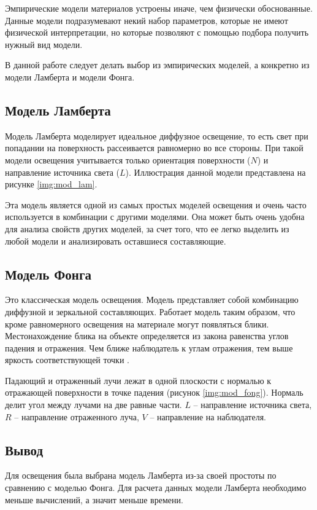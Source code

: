 Эмпирические модели материалов устроены иначе, чем физически обоснованные. Данные модели подразумевают некий набор параметров, которые не имеют физической интерпретации, но которые позволяют с помощью подбора получить нужный вид модели.

В данной работе следует делать выбор из эмпирических моделей, а конкретно из модели Ламберта и модели Фонга.

\subsection{Модель Ламберта}

Модель Ламберта \cite{lamber_fong} моделирует идеальное диффузное освещение, то есть свет при попадании на поверхность рассеивается равномерно во все стороны. При такой модели освещения учитывается только ориентация поверхности ($N$) и направление источника света ($L$). Иллюстрация данной модели представлена на рисунке \ref{img:mod_lam}.


Эта модель является одной из самых простых моделей освещения и очень часто используется в комбинации с другими моделями. Она может быть очень удобна для анализа свойств других моделей, за счет того, что ее легко выделить из любой модели и анализировать оставшиеся составляющие.

\subsection{Модель Фонга}

Это классическая модель освещения. Модель представляет собой комбинацию диффузной и зеркальной составляющих. Работает модель таким образом, что кроме равномерного освещения на материале могут появляться блики. Местонахождение блика на объекте определяется из закона равенства углов падения и отражения. Чем ближе наблюдатель к углам отражения, тем выше яркость соответствующей точки \cite{lamber_fong}.


Падающий и отраженный лучи лежат в одной плоскости с нормалью к отражающей поверхности в точке падения (рисунок \ref{img:mod_fong}). Нормаль делит угол между лучами на две равные части. $L$ – направление источника света, $R$ – направление отраженного луча, $V$ – направление на наблюдателя.

\subsection{Вывод}
Для освещения была выбрана модель Ламберта из-за своей простоты по сравнению с моделью Фонга. Для расчета данных модели Ламберта необходимо меньше вычислений, а значит меньше времени.

